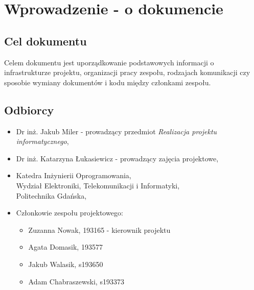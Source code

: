 \documentclass[12pt,a4paper]{book}
\begin{document}


\tableofcontents

\chapter{Wprowadzenie - o dokumencie}
\section{Cel dokumentu}
Celem dokumentu jest uporządkowanie podstawowych informacji o infrastrukturze projektu, organizacji pracy zespołu, rodzajach komunikacji czy sposobie wymiany dokumentów i kodu między członkami zespołu. 

\section{Odbiorcy}

\begin{itemize}
    \item Dr inż. Jakub Miler - prowadzący przedmiot \textit{Realizacja projektu informatycznego},
    \item Dr inż. Katarzyna Łukasiewicz - prowadzący zajęcia projektowe,
    \item Katedra Inżynierii Oprogramowania, \\[2mm] 
Wydział Elektroniki, Telekomunikacji i Informatyki, \\[2mm]  
Politechnika Gdańska,
    \item Członkowie zespołu projektowego:
    \begin{itemize}
        \item[] Zuzanna Nowak, 193165 - kierownik projektu
        \item[] Agata Domasik, 193577
        \item[] Jakub Walasik, s193650
        \item[] Adam Chabraszewski, s193373
    \end{itemize}
\end{itemize}
\end{document}
